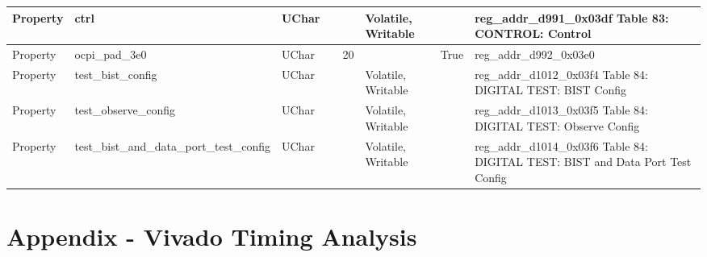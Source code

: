 \documentclass{article}
\begin{document}
\begin{scriptsize}
\begin{longtable}{|p{2cm}|p{5cm}|p{1cm}|p{2cm}|p{2cm}|p{1.75cm}|p{1.5cm}|p{5.1cm}|}
  \hline
  Property & ctrl                                                     & UChar &                  &                  & Volatile,  Writable &         & reg\_addr\_d991\_0x03df Table 83: CONTROL: Control \\
  \hline
  Property & ocpi\_pad\_3e0                                           & UChar &                  & 20               &                     & True    & reg\_addr\_d992\_0x03e0 \\
  \hline
  Property & test\_bist\_config                                       & UChar &                  &                  & Volatile,  Writable &         & reg\_addr\_d1012\_0x03f4 Table 84: DIGITAL TEST: BIST Config \\
  \hline
  Property & test\_observe\_config                                    & UChar &                  &                  & Volatile,  Writable &         & reg\_addr\_d1013\_0x03f5 Table 84: DIGITAL TEST: Observe Config \\
  \hline
  Property & test\_bist\_and\_data\_port\_test\_config                & UChar &                  &                  & Volatile,  Writable &         & reg\_addr\_d1014\_0x03f6 Table 84: DIGITAL TEST: BIST and Data Port Test Config \\
      \hline
    \end{longtable}
  \end{scriptsize}

\section{Appendix - Vivado Timing Analysis} \label{appendix}
\end{document}
